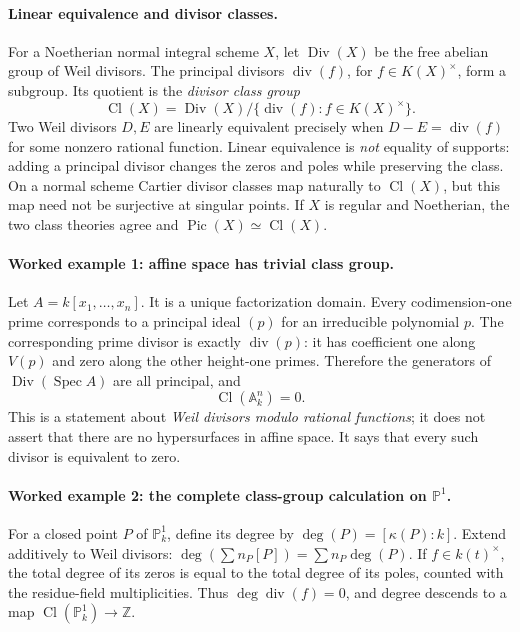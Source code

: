 \paragraph{Linear equivalence and divisor classes.}
For a Noetherian normal integral scheme $X$, let
$\operatorname{Div}(X)$ be the free abelian group of Weil divisors.
The principal divisors $\operatorname{div}(f)$, for
$f\in K(X)^\times$, form a subgroup.  Its quotient is the
\emph{divisor class group}
\[
 \operatorname{Cl}(X)
  =\operatorname{Div}(X)/\{\operatorname{div}(f):f\in K(X)^\times\}.
\]
Two Weil divisors $D,E$ are linearly equivalent precisely when
$D-E=\operatorname{div}(f)$ for some nonzero rational function.
Linear equivalence is \emph{not} equality of supports: adding a
principal divisor changes the zeros and poles while preserving the
class.  On a normal scheme Cartier divisor classes map naturally
to $\operatorname{Cl}(X)$, but this map need not be surjective at
singular points.  If $X$ is regular and Noetherian, the two class
theories agree and
$\operatorname{Pic}(X)\simeq\operatorname{Cl}(X)$.

\paragraph{Worked example 1: affine space has trivial class group.}
Let $A=k[x_1,\ldots,x_n]$.  It is a unique factorization domain.
Every codimension-one prime corresponds to a principal ideal $(p)$
for an irreducible polynomial $p$.  The corresponding prime divisor
is exactly $\operatorname{div}(p)$: it has coefficient one along
$V(p)$ and zero along the other height-one primes.  Therefore the
generators of $\operatorname{Div}(\operatorname{Spec}A)$ are all
principal, and
\[
 \operatorname{Cl}(\mathbb A_k^n)=0.
\]
This is a statement about \emph{Weil divisors modulo rational
functions}; it does not assert that there are no hypersurfaces in
affine space.  It says that every such divisor is equivalent to zero.

\paragraph{Worked example 2: the complete class-group calculation on
$\mathbb P^1$.}
For a closed point $P$ of $\mathbb P_k^1$, define its degree by
$\deg(P)=[\kappa(P):k]$.  Extend additively to Weil divisors:
$\deg(\sum n_P[P])=\sum n_P\deg(P)$.
If $f\in k(t)^\times$, the total degree of its zeros is equal to
the total degree of its poles, counted with the residue-field
multiplicities.  Thus $\deg\operatorname{div}(f)=0$, and degree
descends to a map $\operatorname{Cl}(\mathbb P_k^1)\to\mathbb Z$.

